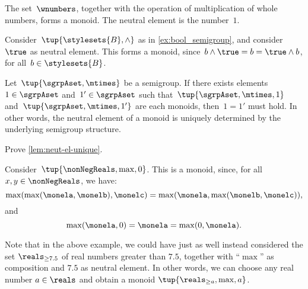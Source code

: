 \begin{example}
    The set~$\wnumbers$, together with the operation of multiplication of whole numbers, forms a monoid.
    The neutral element is the number~$1$.
\end{example}

\begin{example}
    \label{ex:bool_monoid}
    Consider~$\tup{\stylesets{B},\wedge}$ as in \cref{ex:bool_semigroup}, and consider~$\true$ as neutral element.
    This forms a monoid, since~$b\wedge \true=b=\true \wedge b$, for all~$b\in \stylesets{B}$.
\end{example}

\begin{lemma}
    \label{lem:neut-el-unique}
    Let~$\tup{\sgrpAset, \mtimes}$ be a semigroup. If there exists elements~$1 \in \sgrpAset$ and~$1' \in \sgrpAset$ such that~$\tup{\sgrpAset, \mtimes, 1}$ and~$\tup{\sgrpAset, \mtimes, 1'}$ are each monoids, then~$1 = 1'$ must hold.
    In other words, the neutral element of a monoid is uniquely determined by the underlying semigroup structure.
\end{lemma}

\begin{gradedexercise}
    \label{ex:UniqueNeutralMonoid}
    Prove \cref{lem:neut-el-unique}.
\end{gradedexercise}


\begin{example}
    Consider~$\tup{\nonNegReals,\max,0}$. This is a monoid, since, for all~$x,y\in \nonNegReals$, we have:
    \begin{equation*}
        \max(\max(\monela,\monelb),\monelc)=\max(\monela,\max(\monelb,\monelc)),
    \end{equation*}
    and
    \begin{equation*}
        \max(\monela,0)=\monela=\max(0,\monela).
    \end{equation*}
\end{example}

\begin{remark}
    Note that in the above example, we could have just as well instead considered the set $\reals_{\geq 7.5}$ of real numbers greater than $7.5$, together with ``$\max$'' as composition and $7.5$ as neutral element.
    In other words, we can choose any real number $a \in \reals$ and obtain a monoid $\tup{\reals_{\geq a},\max, a}$.
\end{remark}




